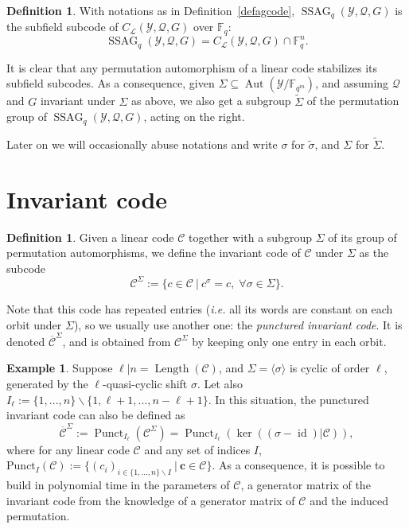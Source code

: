 \documentclass[10pt]{article}
\theoremstyle{definition}
\theoremstyle{definition}
\newtheorem{expl}[thm]{Example}
\theoremstyle{definition}
\newtheorem{def1}[thm]{Definition}
\newcommand{\C}{\mathcal{C}}
\newcommand{\Fqm}{\mathbb{F}_{q^m}}
\newcommand{\Fq}{\mathbb{F}_q}
\newcommand{\su}{\subseteq}
\newcommand{\Y}{\mathcal{Y}}
\newcommand{\QR}{\mathcal{Q}}
\newcommand{\Aut}{\operatorname{Aut}}
\newcommand{\ssag}{\operatorname{SSAG}}
\newcommand{\calL}{\mathcal{L}}
\begin{document}
\begin{def1}
With notations as in Definition~\ref{defagcode}, $\ssag_q(\Y,\QR,G)$ is the subfield subcode of $C_{\calL}(\Y,\QR,G)$ over $\Fq$:
\[ \ssag_q(\Y,\QR,G) = C_{\calL}(\Y,\QR,G) \cap \Fq^n.\]
\end{def1}

It is clear that any permutation automorphism of a linear code stabilizes its subfield subcodes.
As a consequence, given $\Sigma\su\Aut(\Y/\Fqm)$, and assuming $\QR$ and $G$ invariant under $\Sigma$ as above, we also get a subgroup $\tilde{\Sigma}$ of the permutation group of $\ssag_q(\Y,\QR,G)$, acting on the right.

Later on we will occasionally abuse notations and write $\sigma$ for $\tilde{\sigma}$, and $\Sigma$ for $\tilde{\Sigma}$.

%




\section{Invariant code}

\begin{def1} Given a linear code $\mathcal{C}$ together with a subgroup $\Sigma$ of its group of permutation automorphisms, we define the invariant code of $\mathcal{C}$ under $\Sigma$ as the subcode
$$\mathcal{C}^{\Sigma} := \{c \in \mathcal{C} \ | \ c^\sigma=c,\;\forall\sigma\in\Sigma\}.$$
\end{def1}


Note that this code has repeated entries (\textit{i.e.} all its words are constant on each orbit under $\Sigma$), so we usually use another one: the \emph{punctured invariant code}. It is denoted $\overline{\mathcal{C}}^{\Sigma}$, and is obtained from $\C^{\Sigma}$ by keeping only one entry in each orbit.

\begin{expl}  \label{gen inv}
Suppose $\ell|n=\operatorname{Length}(\mathcal{C})$, and $\Sigma = \langle \sigma \rangle$ is cyclic of order $\ell$, generated by the $\ell$-quasi-cyclic shift $\sigma$. Let also $I_{\ell} := \{1,...,n\}\backslash \{1,\ell+1,...,n-\ell+1\}$. In this situation, the punctured invariant code can also be defined as
\[ \overline{\mathcal{C}}^{\Sigma} := \operatorname{Punct}_{I_{\ell}}(\mathcal{C}^{\Sigma}) = \operatorname{Punct}_{ I_{\ell}}(\ker ((\sigma-\operatorname{id})|\mathcal{C})),\]
 where for any linear code $\mathcal{C}$ and any set of indices $I$, $\mathrm{Punct}_I(\mathcal{C}):= \{(c_i)_{i \in \{1,...,n\}\backslash I} \ | \ \mathbf{c} \in \mathcal{C}\}$. 
As a consequence, it is possible to build in polynomial time in the parameters of $\mathcal{C}$, a generator matrix of the invariant code from the knowledge of a generator matrix of $\mathcal{C}$ and the induced permutation. 
\end{expl}
\end{document}
